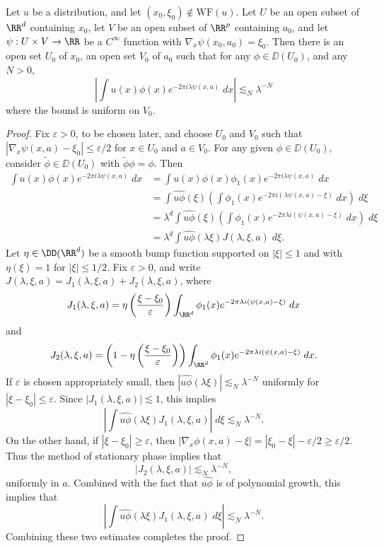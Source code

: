 \begin{theorem}
    Let $u$ be a distribution, and let $(x_0,\xi_0) \not \in \text{WF}(u)$. Let $U$ be an open subset of $\RR^d$ containing $x_0$, let $V$ be an open subset of $\RR^p$ containing $a_0$, and let $\psi: U \times V \to \RR$ be a $C^\infty$ function with $\nabla_x \psi(x_0,a_0) = \xi_0$. Then there is an open set $U_0$ of $x_0$, an open set $V_0$ of $a_0$ such that for any $\phi \in \DD(U_0)$, and any $N > 0$,
    \[ \left| \int u(x) \phi(x) e^{-2 \pi i \lambda \psi(x,a)}\; dx \right| \lesssim_N \lambda^{-N} \]
    where the bound is uniform on $V_0$.
\end{theorem}
\begin{proof}
    Fix $\varepsilon > 0$, to be chosen later, and choose $U_0$ and $V_0$ such that $|\nabla_x \psi(x,a) - \xi_0| \leq \varepsilon/2$ for $x \in U_0$ and $a \in V_0$. For any given $\phi \in \DD(U_0)$, consider $\tilde{\phi} \in \DD(U_0)$ with $\tilde{\phi} \phi = \phi$. Then
    \begin{align*}
        \int u(x) \phi(x) e^{-2 \pi i \lambda \psi(x,a)}\; dx &= \int u(x) \phi(x) \phi_1(x) e^{-2 \pi i \lambda \psi(x,a)}\; dx\\
        &= \int \widehat{u \phi}(\xi) \left( \int \phi_1(x) e^{-2 \pi i (\lambda \psi(x,a) - \xi)}\; dx \right)\; d\xi\\
        &= \lambda^d \int \widehat{u \phi}(\xi) \left( \int \phi_1(x) e^{-2 \pi \lambda i(\psi(x,a) - \xi)}\; dx \right)\; d\xi\\
        &= \lambda^d \int \widehat{u \phi}(\lambda \xi) J(\lambda,\xi,a)\; d\xi.
    \end{align*}
    Let $\eta \in \DD(\RR^d)$ be a smooth bump function supported on $|\xi| \leq 1$ and with $\eta(\xi) = 1$ for $|\xi| \leq 1/2$. Fix $\varepsilon > 0$, and write $J(\lambda,\xi,a) = J_1(\lambda,\xi,a) + J_2(\lambda,\xi,a)$, where
    \[ J_1(\lambda,\xi,a) = \eta \left( \frac{\xi - \xi_0}{\varepsilon} \right) \int_{\RR^d} \phi_1(x) e^{-2 \pi \lambda i(\psi(x,a) - \xi)}\; dx \]
    and
    \[ J_2(\lambda,\xi,a) = \left(1 - \eta \left( \frac{\xi - \xi_0}{\varepsilon} \right) \right) \int_{\RR^d} \phi_1(x) e^{-2 \pi \lambda i (\psi(x,a) - \xi)}\; dx. \]
    If $\varepsilon$ is chosen appropriately small, then $|\widehat{u \phi}(\lambda \xi)| \lesssim_N \lambda^{-N}$ uniformly for $|\xi - \xi_0| \leq \varepsilon$. Since $|J_1(\lambda,\xi,a)| \lesssim 1$, this implies
    \[ \left| \int \widehat{u \phi}(\lambda \xi) J_1(\lambda,\xi,a) \right|\; d\xi \lesssim_N \lambda^{-N}. \]
    On the other hand, if $|\xi - \xi_0| \geq \varepsilon$, then $|\nabla_x \phi(x,a) - \xi| = |\xi_0 - \xi| - \varepsilon/2 \geq \varepsilon/2$. Thus the method of stationary phase implies that
    \[ |J_2(\lambda,\xi,a)| \lesssim_N \lambda^{-N}, \]
    uniformly in $a$. Combined with the fact that $\widehat{u \phi}$ is of polynomial growth, this implies that
    \[ \left| \int \widehat{u \phi}(\lambda \xi) J_1(\lambda,\xi,a)\; d\xi \right| \lesssim_N \lambda^{-N}. \]
    Combining these two estimates completes the proof.
\end{proof}

